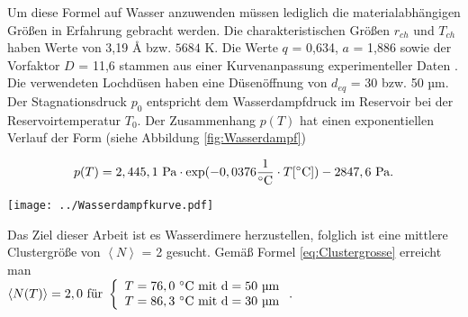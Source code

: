 Um diese Formel auf Wasser anzuwenden müssen lediglich die materialabhängigen Größen in Erfahrung gebracht werden. Die charakteristischen Größen $r_{ch}$ und $T_{ch}$ haben Werte von 3,19 \AA{} bzw. $5684$ K. Die Werte $q$ = 0,634, $a$ = 1,886 sowie der Vorfaktor $D$ = 11,6 stammen aus einer Kurvenanpassung experimenteller Daten \cite{bobbert2002}. Die verwendeten Lochdüsen haben eine Düsenöffnung von $d_{eq}$ = 30 bzw. 50 µm. Der Stagnationsdruck $p_0$ entspricht dem Wasserdampfdruck im Reservoir bei der Reservoirtemperatur $T_0$. Der Zusammenhang $p(T)$ hat einen exponentiellen Verlauf der Form (siehe Abbildung \ref{fig:Wasserdampf})

\begin{equation} \label{eq:Clustergrosse}
p(T) = 2,445,1\ \textmd{Pa} \cdot \textmd{exp}(-0,0376 \frac{1}{^{\circ} \textmd{C}} \cdot T [^{\circ} \textmd{C}]) - 2847,6\ \textmd{Pa} .
\end{equation}

\begin{center}
\begin{minipage}{\linewidth}
\centering
\texttt{[image: ../Wasserdampfkurve.pdf]}%
 \label{fig:Wasserdampf}
\end{minipage} 
\end{center}

Das Ziel dieser Arbeit ist es Wasserdimere herzustellen, folglich ist eine mittlere Clustergröße von $\left \langle N \right\rangle$ = 2 gesucht. Gemäß Formel \ref{eq:Clustergrosse} erreicht man \\ $\left \langle N(T) \right\rangle = 2,0 \textmd{ für }
\left\{ %
   \begin{array}{l}
   T = 76,0\ ^{\circ} \textmd{C} \textmd{ mit d}= 50 \textmd{ µm} \\ 
   T = 86,3\ ^{\circ} \textmd{C} \textmd{ mit d}= 30 \textmd{ µm}
   \end{array}
   \right. .$\\ \\